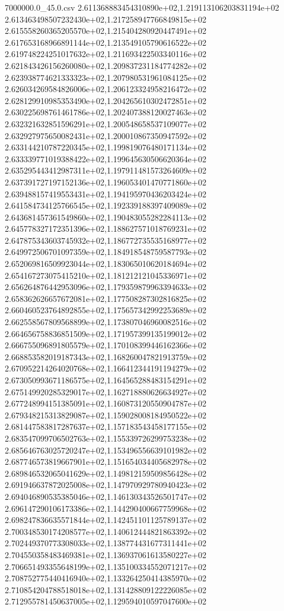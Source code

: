 \begin{filecontents*}{7000000.0_45.0.csv}
2.611368883454310890e+02,1.219113106203831194e+02
2.613463498507232430e+02,1.217258947766849815e+02
2.615558260365205570e+02,1.215404280920447491e+02
2.617653168966891144e+02,1.213549105790616522e+02
2.619748224251017632e+02,1.211693422503340116e+02
2.621843426156260080e+02,1.209837231184774282e+02
2.623938774621333323e+02,1.207980531961084125e+02
2.626034269584826006e+02,1.206123324958216472e+02
2.628129910985353490e+02,1.204265610302472851e+02
2.630225698761461786e+02,1.202407388120027463e+02
2.632321632851596291e+02,1.200548658537109077e+02
2.632927975650082431e+02,1.200010867350947592e+02
2.633144210787220345e+02,1.199819076480171134e+02
2.633339771019388422e+02,1.199645630506620364e+02
2.635295443412987311e+02,1.197911481573264609e+02
2.637391727197152136e+02,1.196053401470771860e+02
2.639488157419553431e+02,1.194195970436203424e+02
2.641584734125766545e+02,1.192339188397409089e+02
2.643681457361549860e+02,1.190483055282284113e+02
2.645778327172351396e+02,1.188627571018769231e+02
2.647875343603745932e+02,1.186772735535168977e+02
2.649972506701097359e+02,1.184918548759587793e+02
2.652069816509923044e+02,1.183065010620184694e+02
2.654167273075415210e+02,1.181212121045336971e+02
2.656264876442953096e+02,1.179359879963394633e+02
2.658362626657672081e+02,1.177508287302816825e+02
2.660460523764892855e+02,1.175657342992253689e+02
2.662558567809568899e+02,1.173807046960082516e+02
2.664656758836851509e+02,1.171957399135199012e+02
2.666755096891805579e+02,1.170108399446162366e+02
2.668853582019187343e+02,1.168260047821913759e+02
2.670952214264020768e+02,1.166412344191194279e+02
2.673050993671186575e+02,1.164565288483154291e+02
2.675149920285329017e+02,1.162718880626634927e+02
2.677248994151385091e+02,1.160873120550904787e+02
2.679348215313829087e+02,1.159028008184950522e+02
2.681447583817287637e+02,1.157183543458177155e+02
2.683547099706502763e+02,1.155339726299753238e+02
2.685646763025720247e+02,1.153496556639101982e+02
2.687746573819667901e+02,1.151654034405682978e+02
2.689846532065041629e+02,1.149812159509856428e+02
2.691946637872025008e+02,1.147970929780940423e+02
2.694046890535385046e+02,1.146130343526501747e+02
2.696147290106173386e+02,1.144290400667759968e+02
2.698247836635571844e+02,1.142451101125789137e+02
2.700348530174208577e+02,1.140612444821863392e+02
2.702449370773308033e+02,1.138774431677311441e+02
2.704550358483469381e+02,1.136937061613580227e+02
2.706651493355648199e+02,1.135100334552071217e+02
2.708752775440416940e+02,1.133264250414385970e+02
2.710854204788518018e+02,1.131428809122226085e+02
2.712955781450637005e+02,1.129594010597047600e+02

\end{filecontents*}
